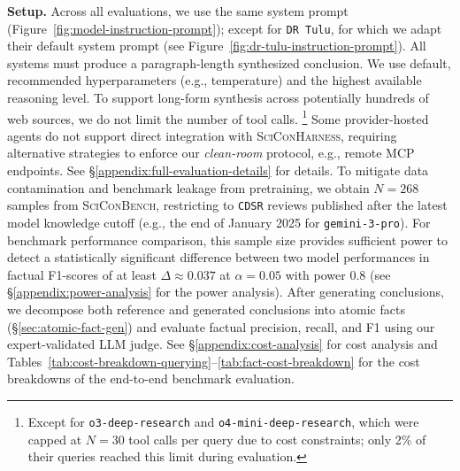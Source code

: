 \documentclass{article}
\newcommand{\xhdr}[1]{%
  \noindent\textbf{#1.}
}
\begin{document}
\xhdr{Setup} Across all evaluations, we use the same system prompt (Figure~\ref{fig:model-instruction-prompt});  except for \texttt{DR Tulu}, for which we adapt their default system prompt (see Figure~\ref{fig:dr-tulu-instruction-prompt}). All systems must produce a paragraph-length synthesized conclusion. We use default, recommended hyperparameters (e.g., temperature) and the highest available reasoning level. To support long-form synthesis across potentially hundreds of web sources, we do not limit the number of tool calls.%
\footnote{Except for \texttt{o3-deep-research} and \texttt{o4-mini-deep-research}, which were capped at $N{=}30$ tool calls per query due to cost constraints; only 2\% of their queries reached this limit during evaluation.} 
Some provider-hosted agents %
do not support direct integration with \textsc{SciConHarness}, requiring alternative strategies to enforce our \textit{clean-room} protocol, e.g., remote MCP endpoints. See \S\ref{appendix:full-evaluation-details} for details.
To mitigate data contamination and benchmark leakage from pretraining, we obtain $N=268$ samples from \textsc{SciConBench}, restricting to \texttt{CDSR} reviews published after the latest model knowledge cutoff (e.g., the end of January 2025 for \texttt{gemini-3-pro}). For benchmark performance comparison, this sample size provides sufficient power to detect a statistically significant difference between two model performances in factual F1-scores of at least $\Delta \approx 0.037$ at $\alpha=0.05$ with power $0.8$ (see \S\ref{appendix:power-analysis} for the power analysis). After generating conclusions, we decompose both reference and generated conclusions into atomic facts (\S\ref{sec:atomic-fact-gen}) and evaluate factual precision, recall, and F1 using our expert-validated LLM judge. See \S\ref{appendix:cost-analysis} for cost analysis and Tables~\ref{tab:cost-breakdown-querying}--\ref{tab:fact-cost-breakdown} for the cost breakdowns of the end-to-end benchmark evaluation.
\end{document}
